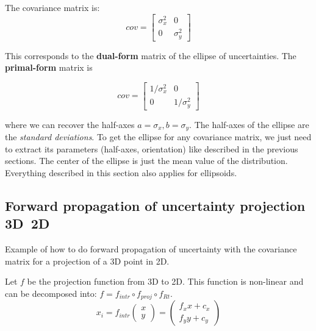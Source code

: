 The covariance matrix is:
\begin{equation}
    cov = \left[\begin{array}{cc}
        \sigma_x^2 & 0 \\
        0 & \sigma_y^2
    \end{array}\right]
\end{equation}

This corresponds to the \textbf{dual-form} matrix of the ellipse of uncertainties. The \textbf{primal-form} matrix is

\begin{equation}
    cov = \left[\begin{array}{cc}
        1/\sigma_x^2 & 0 \\
        0 & 1/\sigma_y^2
    \end{array}\right]
\end{equation}

where we can recover the half-axes $a = \sigma_x, b = \sigma_y$.
The half-axes of the ellipse are the \textit{standard deviations}. To get the ellipse for any covariance matrix, we just need to extract its parameters (half-axes, orientation) like described in the previous sections. The center of the ellipse is just the mean value of the distribution. 
Everything described in this section also applies for ellipsoids.





\subsection{Forward propagation of uncertainty projection 3D~2D}
Example of how to do forward propagation of uncertainty with the covariance matrix for a projection of a 3D point in 2D.

Let $f$ be the projection function from 3D to 2D. This function is non-linear and can be decomposed into: $f = f_{intr} \circ f_{proj} \circ f_{Rt}$.
\begin{equation}
    x_i = f_{intr}\left(\begin{array}{c}
        x \\ y \end{array}\right) = 
        \left(\begin{array}{c}
            f_x x + c_x \\
            f_y y + c_y
        \end{array}\right)
\end{equation}

